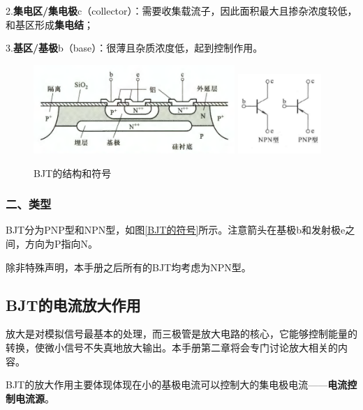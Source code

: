 2.\textbf{集电区/集电极}c（collector）：需要收集载流子，因此面积最大且掺杂浓度较低，和基区形成\textbf{集电结}；

3.\textbf{基区/基极}b（base）：很薄且杂质浓度低，起到控制作用。

\begin{figure}[htb]
    \centering
        {\includegraphics[width=0.68\textwidth]{pic/集成电路中典型NPN型BJT的截面图.png}}\qquad
        {\includegraphics[width=0.28\textwidth]{pic/BJT的符号.png}}
        \caption{BJT的结构和符号\label{BJT的结构和符号}}
\end{figure}

\subsubsection{二、类型}
BJT分为PNP型和NPN型，如图\ref{BJT的符号}所示。注意箭头在基极b和发射极e之间，方向为P指向N。

除非特殊声明，本手册之后所有的BJT均考虑为NPN型。

\subsection{BJT的电流放大作用}
放大是对模拟信号最基本的处理，而三极管是放大电路的核心，它能够控制能量的转换，使微小信号不失真地放大输出。本手册第二章将会专门讨论放大相关的内容。

BJT的放大作用主要体现体现在小的基极电流可以控制大的集电极电流——\textbf{电流控制电流源}。

